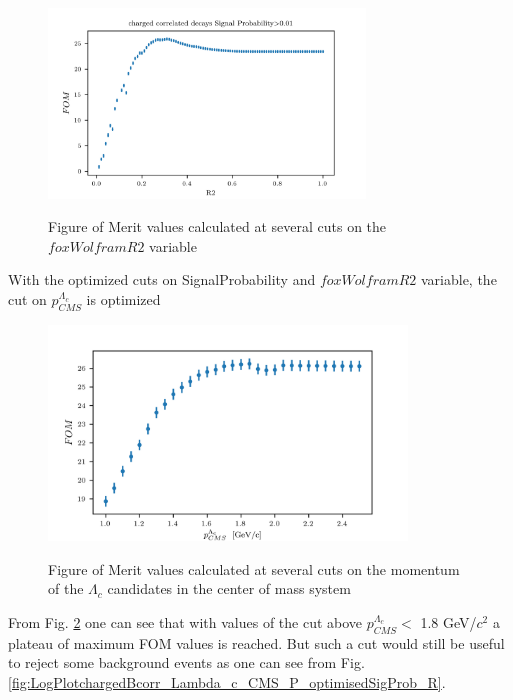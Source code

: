\begin{figure}[h!]
{\includegraphics[width=0.75\textwidth]{04-chargedCorrBtoLambda/figs/corr_chargedB_FOMvsR2_cut_SigProbOpt.png}}
\caption{Figure of Merit values calculated at several cuts on the $foxWolframR2$ variable}
\label{fig:corr_chargedB_FOMvsR2_cut_SigProbOpt}
\end{figure}

With the optimized cuts on SignalProbability and $foxWolframR2$ variable, the cut on $p^{\Lambda_c}_{CMS}$ is optimized\\
\vspace{0.2 cm}
\newpage


\begin{figure}[h!]
{\includegraphics[width=0.85\textwidth]{04-chargedCorrBtoLambda/figs/corr_chargedB_FOMvsCMS_Pcut.png}}
\caption{Figure of Merit values calculated at several cuts on the momentum of the $\Lambda_c$ candidates in the center of mass system}
\label{fig:corr_chargedB_FOMvsCMS_Pcut}
\end{figure}
From Fig. \ref{fig:corr_chargedB_FOMvsCMS_Pcut} one can see that with values of the cut above $p^{\Lambda_c}_{CMS} <$ 1.8 GeV/$c^2$ a plateau of maximum FOM values is reached. But such a cut would still be useful to reject some background events as one can see from Fig. \ref{fig:LogPlotchargedBcorr_Lambda_c_CMS_P_optimisedSigProb_R}. 

